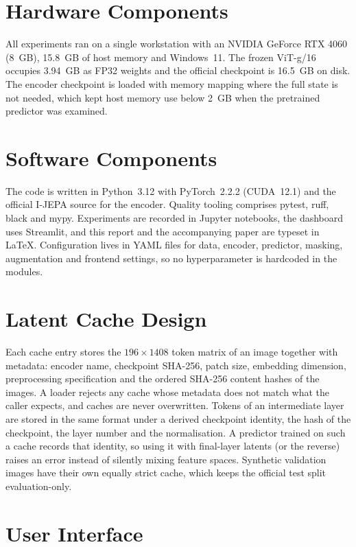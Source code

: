 \documentclass[12pt,a4paper,oneside]{report}
\begin{document}
\section{Hardware Components}

All experiments ran on a single workstation with an NVIDIA GeForce RTX 4060
(8~GB), 15.8~GB of host memory and Windows~11. The frozen ViT-g/16 occupies
3.94~GB as FP32 weights and the official checkpoint is 16.5~GB on disk. The
encoder checkpoint is loaded with memory mapping where the full state is not
needed, which kept host memory use below 2~GB when the pretrained predictor
was examined.

\section{Software Components}

The code is written in Python~3.12 with PyTorch~2.2.2 (CUDA~12.1) and the
official I-JEPA source for the encoder. Quality tooling comprises pytest,
ruff, black and mypy. Experiments are recorded in Jupyter notebooks, the
dashboard uses Streamlit, and this report and the accompanying paper are
typeset in \LaTeX. Configuration lives in YAML files for data, encoder,
predictor, masking, augmentation and frontend settings, so no
hyperparameter is hardcoded in the modules.

\section{Latent Cache Design}

Each cache entry stores the $196\times1408$ token matrix of an image
together with metadata: encoder name, checkpoint SHA-256, patch size,
embedding dimension, preprocessing specification and the ordered SHA-256
content hashes of the images. A loader rejects any cache whose metadata does
not match what the caller expects, and caches are never overwritten. Tokens
of an intermediate layer are stored in the same format under a derived
checkpoint identity, the hash of the checkpoint, the layer number and the
normalisation. A predictor trained on such a cache records that identity, so
using it with final-layer latents (or the reverse) raises an error instead
of silently mixing feature spaces. Synthetic validation images have their
own equally strict cache, which keeps the official test split
evaluation-only.

\section{User Interface}
\end{document}
